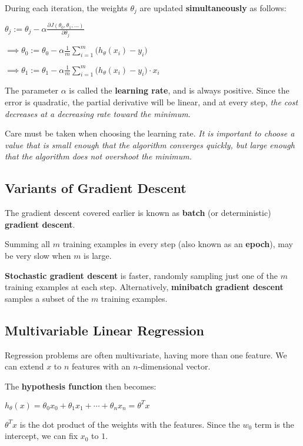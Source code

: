         During each iteration, the weights $\theta_j$ are updated \textbf{simultaneously} as follows:

        $\theta_j := \theta_j - \alpha \frac{\partial J(\theta_0, \theta_1, \dots)}{\partial \theta_j}$

        $\implies \theta_0 := \theta_0 - \alpha \frac{1}{m} \sum_{i=1}^m \big( h_\theta(x_i) - y_i \big)$

        $\implies \theta_1 := \theta_1 - \alpha \frac{1}{m} \sum_{i=1}^m \big( h_\theta(x_i) - y_i \big) \cdot x_i$

        The parameter $\alpha$ is called the \textbf{learning rate}, and is always positive. Since the error is quadratic, the partial derivative will be linear, and at every step, \emph{the cost decreases at a decreasing rate toward the minimum}.

        Care must be taken when choosing the learning rate.
        \emph{It is important to choose a value that is small enough that the algorithm converges quickly, but large enough that the algorithm does not overshoot the minimum.}

    \subsection{Variants of Gradient Descent}
        The gradient descent covered earlier is known as \textbf{batch} (or deterministic) \textbf{gradient descent}.

        Summing all $m$ training examples in every step (also known as an \textbf{epoch}), may be very slow when $m$ is large.

        \textbf{Stochastic gradient descent} is faster, randomly sampling just one of the $m$ training examples at each step. Alternatively, \textbf{minibatch gradient descent} samples a subset of the $m$ training examples.

    \subsection{Multivariable Linear Regression}
        Regression problems are often multivariate, having more than one feature. We can extend $x$ to $n$ features with an $n$-dimensional vector.

        The \textbf{hypothesis function} then becomes:

        $h_\theta(x) = \theta_0x_0 + \theta_1x_1 + \cdots + \theta_nx_n = \theta^T x$

        $\theta^T x$ is the dot product of the weights with the features. Since the $w_0$ term is the intercept, we can fix $x_0$ to $1$.

